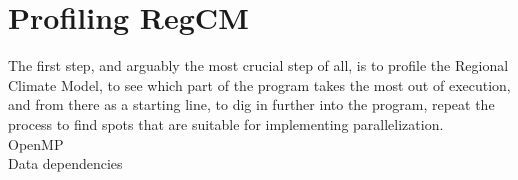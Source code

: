 \section{Profiling RegCM}
The first step, and arguably the most crucial step of all, is to profile the Regional Climate Model, to see which part of the program takes the most out of execution, and from there as a starting line, to dig in further into the program, repeat the process to find spots that are suitable for implementing parallelization. \\
OpenMP\\
Data dependencies\\
